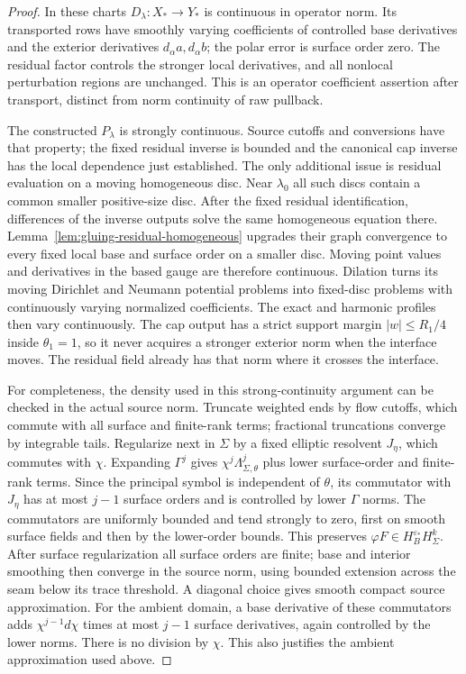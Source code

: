 \documentclass[11pt]{amsart}
\theoremstyle{definition}
\theoremstyle{remark}
\theoremstyle{plain}
\begin{document}
\begin{proof}
In these charts $D_\lambda:X_*\to Y_*$ is continuous in
operator norm. Its transported rows have smoothly varying coefficients
of controlled base derivatives and the exterior derivatives
$d_\alpha a,d_\alpha b$; the polar error is surface order zero.
The residual factor controls the stronger local derivatives, and all
nonlocal perturbation regions are unchanged. This is an operator
coefficient assertion after transport, distinct from norm continuity
of raw pullback.

The constructed $P_\lambda$ is strongly continuous. Source
cutoffs and conversions have that property; the fixed residual inverse
is bounded and the canonical cap inverse has the local dependence
just established. The only additional issue is residual evaluation
on a moving homogeneous disc. Near $\lambda_0$ all such discs
contain a common smaller positive-size disc. After the fixed residual
identification, differences of the inverse outputs solve the same
homogeneous equation there. Lemma~\ref{lem:gluing-residual-homogeneous}
upgrades their graph convergence to every fixed local base and surface
order on a smaller disc. Moving point values and derivatives in the
based gauge are therefore continuous. Dilation turns its moving
Dirichlet and Neumann potential problems into fixed-disc problems
with continuously varying normalized coefficients. The exact and
harmonic profiles then vary continuously. The cap output has a strict
support margin $|w|\leq R_1/4$ inside $\theta_1=1$, so it
never acquires a stronger exterior norm when the interface moves.
The residual field already has that norm where it crosses the interface.

For completeness, the density used in this strong-continuity argument
can be checked in the actual source norm. Truncate weighted ends by
flow cutoffs, which commute with all surface and finite-rank terms;
fractional truncations converge by integrable tails. Regularize next
in $\Sigma$ by a fixed elliptic resolvent $J_\eta$, which
commutes with $\chi$. Expanding $\Gamma^j$ gives
$\chi^j\Lambda_{\Sigma,\theta}^j$ plus lower surface-order
and finite-rank terms. Since the principal symbol is independent
of $\theta$, its commutator with $J_\eta$ has at most
$j-1$ surface orders and is controlled by lower $\Gamma$
norms. The commutators are uniformly bounded and tend strongly
to zero, first on smooth surface fields and then by the lower-order
bounds. This preserves $\varphi F\in H_B^{\varepsilon_*}H^k_\Sigma$.
After surface regularization all surface orders are finite; base and
interior smoothing then converge in the source norm, using bounded
extension across the seam below its trace threshold. A diagonal
choice gives smooth compact source approximation. For the ambient
domain, a base derivative of these commutators adds
$\chi^{j-1}d\chi$ times at most $j-1$ surface derivatives,
again controlled by the lower norms. There is no division by $\chi$.
This also justifies the ambient approximation used above.


\end{proof}
\end{document}
